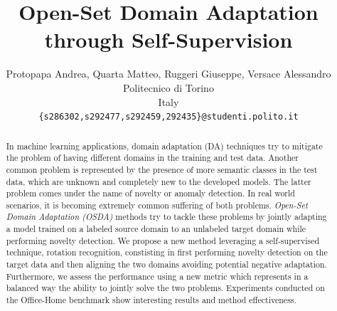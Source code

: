 \documentclass[10pt,twocolumn,letterpaper]{article}
\begin{document}
\title{Open-Set Domain Adaptation through Self-Supervision}

\author{Protopapa Andrea, Quarta Matteo, Ruggeri Giuseppe, Versace Alessandro\\
Politecnico di Torino\\
Italy\\
{\tt\small \{s286302,s292477,s292459,292435\}@studenti.polito.it}
}
\maketitle

\begin{abstract}
  In machine learning applications, domain adaptation (DA) techniques try to mitigate the problem of having different domains in the training and test data.
  Another common problem is represented by the presence of more semantic classes in the test data, which are unknown
  and completely new to the developed models. The latter problem comes under the name of novelty or anomaly detection.
  In real world scenarios, it is becoming extremely common suffering of both problems.
  \textit{Open-Set Domain Adaptation (OSDA)} methods try to tackle these problems by jointly adapting a model trained on a labeled source domain to an unlabeled target domain
  while performing novelty detection. We propose a new method leveraging a self-supervised technique, rotation recognition, constisting in first performing
  novelty detection on the target data and then aligning the two domains avoiding potential negative adaptation.
  Furthermore, we assess the performance using a new metric which represents in a balanced way the ability to jointly solve the two problems.
  Experiments conducted on the Office-Home benchmark show interesting results and method effectiveness.
   

\end{abstract}
\end{document}
